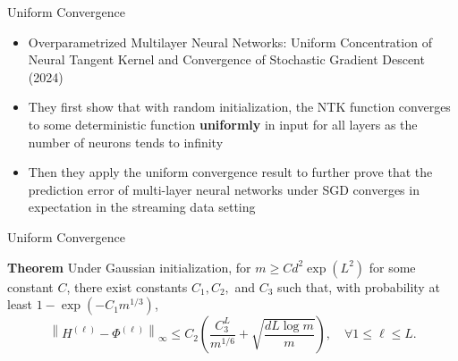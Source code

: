 \documentclass[serif, aspectratio=169]{beamer}
\begin{document}
\begin{frame}{Uniform Convergence}
	\begin{itemize}
		
\item Overparametrized Multilayer Neural Networks: Uniform Concentration of Neural Tangent Kernel and Convergence of Stochastic Gradient Descent (2024)
\item They first show that with random initialization, the NTK function converges to some
deterministic function \textbf{uniformly} in input for all layers as the number of neurons tends to infinity
\item Then they apply the uniform convergence result to further prove that the prediction error of multi-layer neural networks under SGD converges in expectation in the streaming data setting
	\end{itemize}

\end{frame}


\begin{frame}{Uniform Convergence}

\textbf{Theorem} Under Gaussian initialization, for \( m \geq C d^2 \exp(L^2) \) for some constant \( C \), there exist constants \( C_1, C_2, \) and \( C_3 \) such that, with probability at least \( 1 - \exp(-C_1 m^{1/3}) \),
\[
\left\| H^{(\ell)} - \Phi^{(\ell)} \right\|_{\infty} \leq C_2 \left( \frac{C_3^L}{m^{1/6}} + \sqrt{\frac{d L \log m}{m}} \right), \quad \forall 1 \leq \ell \leq L.
\]

	
\end{frame}
\end{document}

